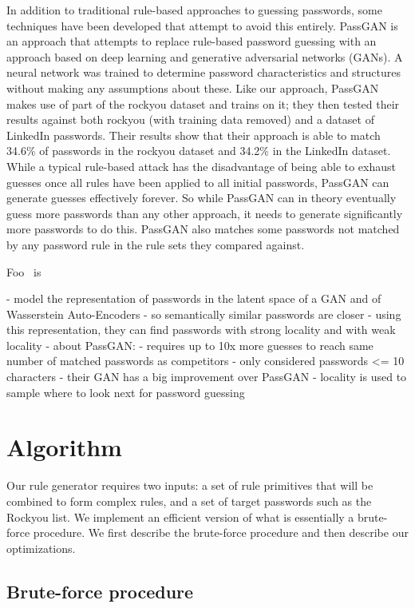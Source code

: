 \documentclass[letterpaper,twocolumn,10pt]{article}
\begin{document}
In addition to traditional rule-based approaches to guessing passwords, some techniques have
been developed that attempt to avoid this entirely.  PassGAN is an approach that attempts to replace rule-based
password guessing with an approach based on deep learning and generative adversarial networks (GANs).
A neural network was trained to determine password characteristics and structures without making any
assumptions about these. Like our approach, PassGAN makes use of part of the rockyou dataset and
trains on it; they then tested their results against both rockyou (with training data removed)
and a dataset of LinkedIn passwords. Their results show that their approach is able to match 34.6\% of
passwords in the rockyou dataset and 34.2\% in the LinkedIn dataset. While a typical rule-based attack
has the disadvantage of being able to exhaust guesses once all rules have been applied to all initial
passwords, PassGAN can generate guesses effectively forever. So while PassGAN can in theory eventually
guess more passwords than any other approach, it needs to generate significantly more passwords to do
this. PassGAN also matches some passwords not matched by any password rule in the rule sets they
compared against.\cite{hitaj2019passgan}

Foo~\cite{pasquini2021improving} is

- model the representation of passwords in the latent space of a GAN and of
Wasserstein Auto-Encoders
    - so semantically similar passwords are closer
- using this representation, they can find passwords with strong locality and
with weak locality
- about PassGAN:
    - requires up to 10x more guesses to reach same number of matched passwords
as competitors
    - only considered passwords <= 10 characters
- their GAN has a big improvement over PassGAN
- locality is used to sample where to look next for password guessing

\section{Algorithm}
\label{sec:algorithm}

Our rule generator requires two inputs: a set of rule primitives that will be
combined to form complex rules, and a set of target passwords such as the
Rockyou list. We implement an efficient version of what is essentially a
brute-force procedure. We first describe the brute-force procedure and then
describe our optimizations.


\subsection{Brute-force procedure}
\end{document}
